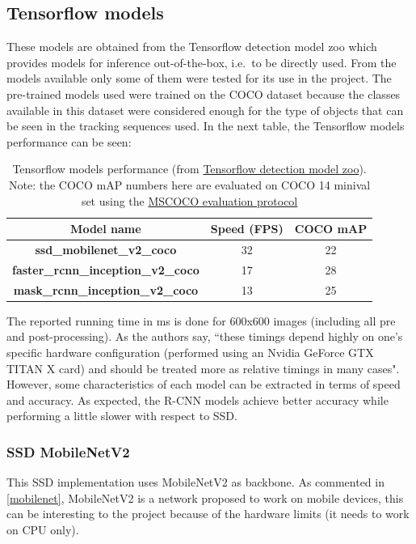 \subsection{Tensorflow models} \label{tf_models}
These models are obtained from the Tensorflow detection model zoo which provides models for inference out-of-the-box, i.e.\ to be directly used. From the models available only some of them were tested for its use in the project. The pre-trained models used were trained on the COCO dataset because the classes available in this dataset were considered enough for the type of objects that can be seen in the tracking sequences used. In the next table, the Tensorflow models performance can be seen:
\begin{table}[H]
\begin{center}
\begin{tabular}{|c|c|c|}
\hline
Model name                                 & Speed (FPS) & COCO mAP \\ \hline
\textbf{ssd\_mobilenet\_v2\_coco}          & 32         & 22       \\ \hline
\textbf{faster\_rcnn\_inception\_v2\_coco} & 17         & 28       \\ \hline
\textbf{mask\_rcnn\_inception\_v2\_coco}   & 13         & 25       \\ \hline
\end{tabular}
\end{center}
\caption{Tensorflow models performance (from \href{https://github.com/tensorflow/models/blob/master/research/object_detection/g3doc/detection_model_zoo.md#coco-trained-models}{Tensorflow detection model zoo}). Note: the COCO mAP numbers here are evaluated on COCO 14 minival set using the \href{http://cocodataset.org/#detection-eval}{MSCOCO evaluation protocol}}
\end{table}
The reported running time in ms is done for 600x600 images (including all pre and post-processing). As the authors say, ``these timings depend highly on one's specific hardware configuration (performed using an Nvidia GeForce GTX TITAN X card) and should be treated more as relative timings in many cases". However, some characteristics of each model can be extracted in terms of speed and accuracy. As expected, the R-CNN models achieve better accuracy while performing a little slower with respect to SSD.

\subsubsection{SSD MobileNetV2}
This SSD implementation uses MobileNetV2 as backbone. As commented in \ref{mobilenet}, MobileNetV2 is a network proposed to work on mobile devices, this can be interesting to the project because of the hardware limits (it needs to work on CPU only).
